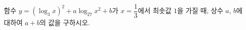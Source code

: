 함수 $y=(\log_3 x)^2+a\log_{27} x^2+b$가 $x=\dfrac{1}{3}$에서 최솟값 $1$을 가질 때, 상수 $a$, $b$에 대하여 $a+b$의 값을 구하시오.
